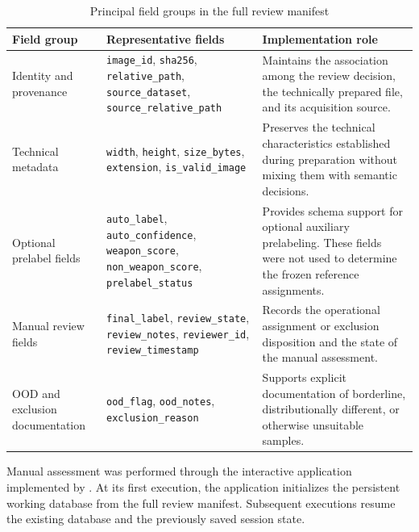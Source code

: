 \begin{table}[H]
\centering
\scriptsize
\renewcommand{\arraystretch}{1.15}
\setlength{\tabcolsep}{4pt}
\caption{Principal field groups in the full review manifest}
\label{tab:implementation-review-manifest-schema}
\begin{tabularx}{\textwidth}{@{}p{} p{} X@{}}
\toprule
\textbf{Field group} &
\textbf{Representative fields} &
\textbf{Implementation role} \\
\midrule

Identity and provenance
&
\texttt{image\_id}, \texttt{sha256}, \texttt{relative\_path},
\texttt{source\_dataset}, \texttt{source\_relative\_path}
&
Maintains the association among the review decision, the technically prepared
file, and its acquisition source. \\

Technical metadata
&
\texttt{width}, \texttt{height}, \texttt{size\_bytes},
\texttt{extension}, \texttt{is\_valid\_image}
&
Preserves the technical characteristics established during preparation without
mixing them with semantic decisions. \\

Optional prelabel fields
&
\texttt{auto\_label}, \texttt{auto\_confidence},
\texttt{weapon\_score}, \texttt{non\_weapon\_score},
\texttt{prelabel\_status}
&
Provides schema support for optional auxiliary prelabeling. These fields were
not used to determine the frozen reference assignments. \\

Manual review fields
&
\texttt{final\_label}, \texttt{review\_state},
\texttt{review\_notes}, \texttt{reviewer\_id},
\texttt{review\_timestamp}
&
Records the operational assignment or exclusion disposition and the state of
the manual assessment. \\

OOD and exclusion documentation
&
\texttt{ood\_flag}, \texttt{ood\_notes},
\texttt{exclusion\_reason}
&
Supports explicit documentation of borderline, distributionally different, or
otherwise unsuitable samples. \\

\bottomrule
\end{tabularx}
\end{table}

Manual assessment was performed through the interactive application implemented
by
.
At its first execution, the application initializes the persistent working
database
from the full review manifest. Subsequent executions resume the existing
database and the previously saved session state.

